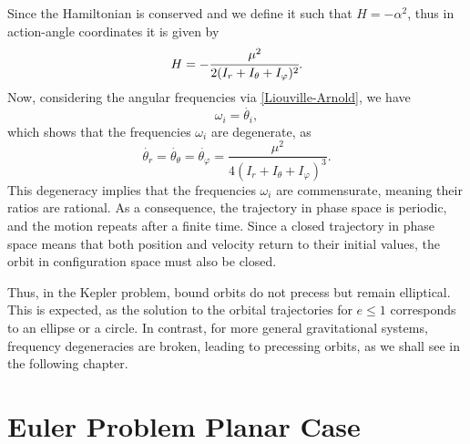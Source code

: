 \documentclass[12pt,oneside]{report}
\theoremstyle{definition}
\begin{document}
Since the Hamiltonian is conserved and we define it such that $H = -\alpha^{2}$, thus in action-angle coordinates it is given by
\begin{equation}
    H = -\cfrac{\mu^{2}}{2(I_{r}+I_{\theta}+I_{\varphi})^{2}}.
\end{equation}
Now, considering the angular frequencies via \autoref{Liouville-Arnold}, we have  
\[
\omega_{i} = \dot{\theta_{i}},
\]  
which shows that the frequencies \(\omega_{i}\) are degenerate, as  
\[
\dot{\theta_r} = \dot{\theta_\theta} = \dot{\theta_\varphi} = \frac{\mu^2}{4(I_r + I_\theta + I_\varphi)^3}.
\]  
This degeneracy implies that the frequencies \(\omega_{i}\) are commensurate, meaning their ratios are rational. As a consequence, the trajectory in phase space is periodic, and the motion repeats after a finite time. Since a closed trajectory in phase space means that both position and velocity return to their initial values, the orbit in configuration space must also be closed.  

Thus, in the Kepler problem, bound orbits do not precess but remain elliptical. This is expected, as the solution to the orbital trajectories for \( e \leq 1 \) corresponds to an ellipse or a circle. In contrast, for more general gravitational systems, frequency degeneracies are broken, leading to precessing orbits, as we shall see in the following chapter.  







\chapter{Euler Problem Planar Case}
\end{document}
